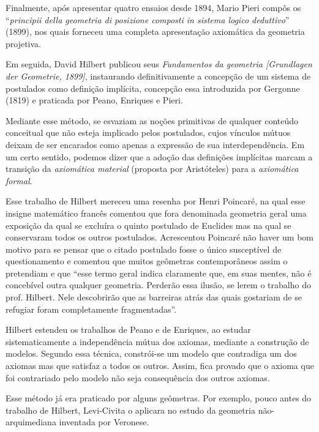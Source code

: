 \documentclass{hipatia}
\begin{document}
Finalmente, após apresentar quatro ensaios desde 1894, Mario Pieri compôs os ``\emph{principii della geometria di posizione composti in sistema logico deduttivo}'' (1899), nos quais forneceu uma completa apresentação axiomática da geometria projetiva.  \cite[, p. 226--227]{kneebone1963} 
\cite[p. 317]{bottazzini2001}

Em seguida, David Hilbert publicou seus \emph{Fundamentos da geometria [Grundlagen der Geometrie, 1899]}, instaurando definitivamente a concepção de um sistema de postulados como definição implícita, concepção essa introduzida por Gergonne (1819) e praticada por Peano, Enriques e Pieri. 

Mediante esse método, se esvaziam as noções primitivas de qualquer conteúdo conceitual que não esteja implicado pelos postulados, cujos vínculos mútuos deixam de ser encarados como apenas a expressão de sua interdependência. Em um certo sentido, podemos dizer que a adoção das definições implícitas marcam a transição da \emph{axiomática material}  (proposta por Aristóteles)  para a \emph{axiomática formal}. \cite[p. 115]{beth1955}\cite[p. 691]{kneale}\cite[p. 201]{kneebone1963}

Esse trabalho de Hilbert mereceu uma resenha por Henri Poincaré, na qual esse insigne matemático francês comentou que fora denominada geometria geral uma exposição da qual se excluíra o quinto postulado de Euclides mas na qual se conservaram todos os outros postulados. Acrescentou Poincaré não haver um bom motivo para se pensar que o citado postulado fosse o único susceptível de questionamento e comentou que muitos geômetras contemporâneos assim o pretendiam e que ``esse termo geral indica claramente que, em suas mentes, não é concebível outra qualquer geometria. Perderão essa ilusão, se lerem o trabalho do prof. Hilbert. Nele descobrirão que as barreiras atrás das quais gostariam de se refugiar foram completamente fragmentadas''. \cite[p. 77-78]{poincare1999}

Hilbert estendeu os trabalhos de Peano e de Enriques, ao estudar sistematicamente a independência mútua dos axiomas, mediante a construção de modelos. Segundo essa técnica, constrói-se um modelo que contradiga um dos axiomas mas que satisfaz a todos os outros. Assim, fica provado que o axioma que foi contrariado pelo modelo não seja consequência dos outros axiomas.

Esse método já era praticado por alguns geômetras. Por exemplo, pouco antes do trabalho de Hilbert, Levi-Civita o aplicara no estudo da geometria não-arquimediana inventada por Veronese. 
\end{document}
